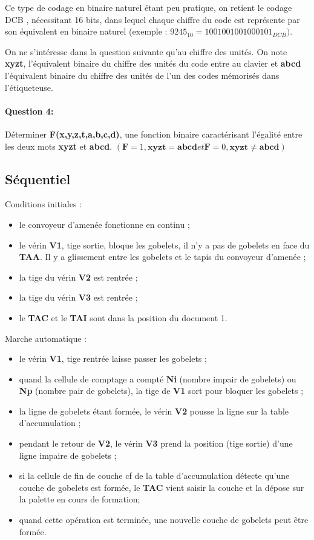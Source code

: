 Ce type de codage en binaire naturel étant peu pratique, on retient le codage \og DCB \fg, nécessitant 16 bits, dans lequel chaque chiffre du code est représente par son équivalent en binaire naturel (exemple : $9245_{10} = 1001 0010 0100 0101_{DCB})$.

On ne s'intéresse dans la question suivante qu'au chiffre des unités. On note \textbf{xyzt}, l'équivalent binaire du chiffre des unités du code entre au clavier et \textbf{abcd} l'équivalent binaire du chiffre des unités de l'un des codes mémorisés dans l'étiqueteuse.

\paragraph{Question 4:} Déterminer \textbf{F(x,y,z,t,a,b,c,d)}, une fonction binaire caractérisant l'égalité entre les deux mots \textbf{xyzt} et \textbf{abcd}. $(\textbf{F} = 1, \textbf{xyzt} = \textbf{abcd} et \textbf{F} = 0, \textbf{xyzt} \neq \textbf{abcd})$

\subsection{Séquentiel}

Conditions initiales :
\begin{itemize}
 \item le convoyeur d'amenée fonctionne en continu ;
 \item le vérin \textbf{V1}, tige sortie, bloque les gobelets, il n'y a pas de gobelets en face du \textbf{TAA}. Il y a glissement entre les gobelets et le tapis du convoyeur d'amenée ;
 \item la tige du vérin \textbf{V2} est rentrée ;
 \item la tige du vérin \textbf{V3} est rentrée ;
 \item le \textbf{TAC} et le \textbf{TAI} sont dans la position du document 1.
\end{itemize}

Marche automatique :
\begin{itemize}
 \item le vérin \textbf{V1}, tige rentrée laisse passer les gobelets ;
 \item quand la cellule de comptage a compté \textbf{Ni} (nombre impair de gobelets) ou \textbf{Np} (nombre pair de gobelets), la tige de \textbf{V1} sort pour bloquer les gobelets ;
 \item la ligne de gobelets étant formée, le vérin \textbf{V2} pousse la ligne sur la table d'accumulation ;
 \item pendant le retour de \textbf{V2}, le vérin \textbf{V3} prend la position (tige sortie) d'une ligne impaire de
gobelets ;
 \item si la cellule de fin de couche cf de la table d'accumulation détecte qu'une couche de gobelets est formée, le \textbf{TAC} vient saisir la couche et la dépose sur la palette en cours de formation;
 \item quand cette opération est terminée, une nouvelle couche de gobelets peut être formée.
\end{itemize}
 
